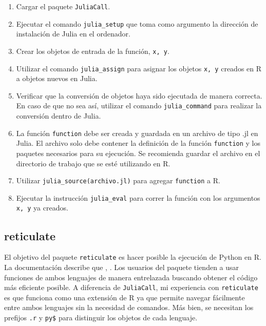 \begin{enumerate}
	\item Cargar el paquete \texttt{JuliaCall}. 
	
	\item Ejecutar el comando \texttt{julia\_setup} que toma como argumento la dirección de instalación de \textsf{Julia} en el ordenador. 
	
	\item Crear los objetos de entrada de la función, \texttt{x, y}. 
	
	\item Utilizar el comando \texttt{julia\_assign} para asignar los objetos \texttt{x, y} creados en \textsf{R} a objetos nuevos en \textsf{Julia}. 
	
	\item Verificar que la conversión de objetos haya sido ejecutada de manera correcta. En caso de que no sea así, utilizar el comando \texttt{julia\_command} para realizar la conversión dentro de \textsf{Julia}. 
	
	\item La función \texttt{function} debe ser creada y guardada en un archivo de tipo \textsf{.jl} en \textsf{Julia}. El archivo solo debe contener la definición de la función \texttt{function} y los paquetes necesarios para su ejecución. Se recomienda guardar el archivo en el directorio de trabajo que se esté utilizando en \textsf{R}. 
	
	\item Utilizar \texttt{julia\_source(archivo.jl)} para agregar \texttt{function} a \textsf{R}. 
	
	\item Ejecutar la instrucción \texttt{julia\_eval} para correr la función con los argumentos \texttt{x, y} ya creados. 
	 
\end{enumerate}

\subsection{reticulate}

El objetivo del paquete \texttt{reticulate} es hacer posible la ejecución de \textsf{Python} en \textsf{R}. La documentación describe que , \cite{reticulate_package}. Los usuarios del paquete tienden a usar funciones de ambos lenguajes de manera entrelazada buscando obtener el código más eficiente posible. A diferencia de \texttt{JuliaCall}, mi experiencia con \texttt{reticulate} es que funciona como una extensión de \textsf{R} ya que permite navegar fácilmente entre ambos lenguajes sin la necesidad de comandos. Más bien, se necesitan los prefijos \texttt{.r} y \texttt{py\$} para distinguir los objetos de cada lenguaje. 

